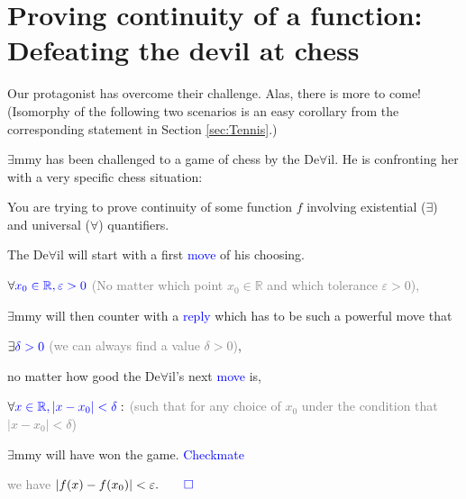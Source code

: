 \documentclass[11pt]{article}
\theoremstyle{plain}
\theoremstyle{definition}
\theoremstyle{remark}
\numberwithin{equation}{section}
\newcommand{\e}{\exists}
\newcommand{\f}{\forall}
\newcommand{\R}{\mathbb{R}}
\newcommand{\eps}{\varepsilon}
\begin{document}
\section{Proving continuity of a function: Defeating the devil at chess}
Our protagonist has overcome their challenge. Alas, there is more to come! (Isomorphy of the following two scenarios is an easy corollary from the corresponding statement in Section \ref{sec:Tennis}.)
\begin{paracol}{2}
\begin{nthcolumn*}{0}
$\e$mmy has been challenged to a game of chess by the De$\f$il. He is confronting her with a very specific chess situation:
\end{nthcolumn*}
    \begin{nthcolumn}{1}
    You are trying to prove continuity of some function $f$ involving existential ($\e$) and universal ($\f$) quantifiers.
    \end{nthcolumn}
        
\begin{nthcolumn*}{0}
The De$\f$il will start with a first \textcolor{blue}{move} of his choosing.
\end{nthcolumn*}
    \begin{nthcolumn}{1}
    $ \forall {\color{blue}x_0\in\R, \eps > 0}$ \textcolor{gray}{(No matter which point $x_0\in \R$ and which tolerance $\eps > 0$),}
    \end{nthcolumn}

\begin{nthcolumn*}{0}
$\e$mmy will then counter with a \textcolor{blue}{reply} which has to be such a powerful move that
\end{nthcolumn*}
    \begin{nthcolumn}{1}
    $\exists {\color{blue}\delta > 0}$ \textcolor{gray}{(we can always find a value $\delta > 0$)},
    \end{nthcolumn}

\begin{nthcolumn*}{0}
no matter how good the De$\f$il's next \textcolor{blue}{move} is,
\end{nthcolumn*}
    \begin{nthcolumn}{1}
    $\forall {\color{blue}x\in\R, |x-x_0|<\delta}:$ \textcolor{gray}{(such that for any choice of $x_0$ under the condition that $|x-x_0|< \delta$)}
    \end{nthcolumn}
        
\begin{nthcolumn*}{0}
$\e$mmy will have won the game. \textcolor{blue}{Checkmate}
\end{nthcolumn*}
    \begin{nthcolumn}{1}
    \textcolor{gray}{we have} $|f(x)-f(x_0)| < \eps. {\color{blue}\qed}$
    \end{nthcolumn}     
\end{paracol}
\ifvoid\mybox\else\insert\footins{\unvbox\mybox}\fi
\end{document}
